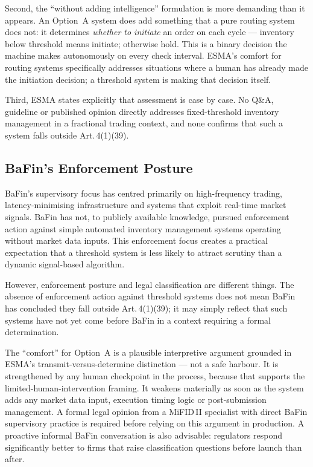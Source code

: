 \documentclass[12pt,a4paper]{report}
\begin{document}
Second, the ``without adding intelligence'' formulation is more demanding than it
appears. An Option~A system does add something that a pure routing system does not: it
determines \textit{whether to initiate} an order on each cycle --- inventory below
threshold means initiate; otherwise hold. This is a binary decision the machine makes
autonomously on every check interval. ESMA's comfort for routing systems specifically
addresses situations where a human has already made the initiation decision; a threshold
system is making that decision itself.

Third, ESMA states explicitly that assessment is case by case. No Q\&A, guideline or
published opinion directly addresses fixed-threshold inventory management in a fractional
trading context, and none confirms that such a system falls outside Art.\,4(1)(39).

\subsection{BaFin's Enforcement Posture}

BaFin's supervisory focus has centred primarily on high-frequency trading,
latency-minimising infrastructure and systems that exploit real-time market signals.
BaFin has not, to publicly available knowledge, pursued enforcement action against simple
automated inventory management systems operating without market data inputs. This
enforcement focus creates a practical expectation that a threshold system is less likely
to attract scrutiny than a dynamic signal-based algorithm.

However, enforcement posture and legal classification are different things. The absence
of enforcement action against threshold systems does not mean BaFin has concluded they
fall outside Art.\,4(1)(39); it may simply reflect that such systems have not yet come
before BaFin in a context requiring a formal determination.

\begin{warnbox}[Assessment]
The ``comfort'' for Option~A is a plausible interpretive argument grounded in ESMA's
transmit-versus-determine distinction --- not a safe harbour. It is strengthened by
any human checkpoint in the process, because that supports the limited-human-intervention
framing. It weakens materially as soon as the system adds any market data input, execution
timing logic or post-submission management. A formal legal opinion from a MiFID\,II
specialist with direct BaFin supervisory practice is required before relying on this
argument in production. A proactive informal BaFin conversation is also advisable:
regulators respond significantly better to firms that raise classification questions
before launch than after.
\end{warnbox}
\end{document}

